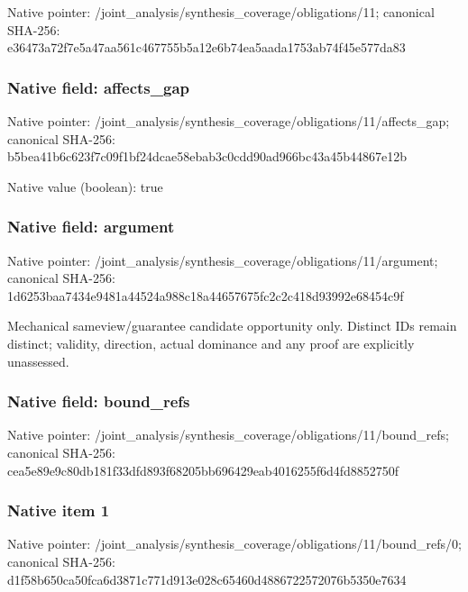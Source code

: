 \documentclass[10pt,a4paper]{article}
\begin{document}
Native pointer: /joint\_analysis/synthesi\allowbreak{}s\_coverage/obligations/1\allowbreak{}1; canonical SHA-256: e36473a72f7e5a47aa561c46\allowbreak{}7755b5a12e6b74ea5aada175\allowbreak{}3ab74f45e577da83



\subsubsection{Native field: affects\_gap}


Native pointer: /joint\_analysis/synthesi\allowbreak{}s\_coverage/obligations/1\allowbreak{}1/affects\_gap; canonical SHA-256: b5bea41b6c623f7c09f1bf24\allowbreak{}dcae58ebab3c0cdd90ad966b\allowbreak{}c43a45b44867e12b



Native value (boolean): true



\subsubsection{Native field: argument}


Native pointer: /joint\_analysis/synthesi\allowbreak{}s\_coverage/obligations/1\allowbreak{}1/argument; canonical SHA-256: 1d6253baa7434e9481a44524\allowbreak{}a988c18a44657675fc2c2c41\allowbreak{}8d93992e68454c9f


Mechanical sameview/guarantee candidate opportunity only. Distinct IDs remain distinct; validity, direction, actual dominance and any proof are explicitly unassessed.


\subsubsection{Native field: bound\_refs}


Native pointer: /joint\_analysis/synthesi\allowbreak{}s\_coverage/obligations/1\allowbreak{}1/bound\_refs; canonical SHA-256: cea5e89e9c80db181f33dfd8\allowbreak{}93f68205bb696429eab40162\allowbreak{}55f6d4fd8852750f



\subsubsection{Native item 1}


Native pointer: /joint\_analysis/synthesi\allowbreak{}s\_coverage/obligations/1\allowbreak{}1/bound\_refs/0; canonical SHA-256: d1f58b650ca50fca6d3871c7\allowbreak{}71d913e028c65460d4886722\allowbreak{}572076b5350e7634
\end{document}
